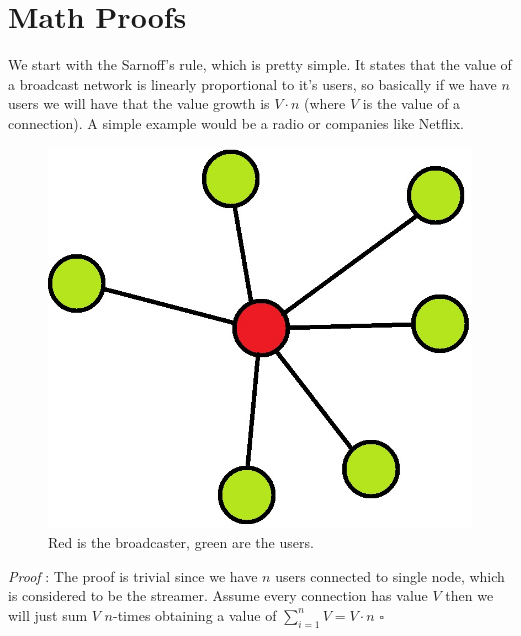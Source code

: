\documentclass[12pt, a4page]{article}
\begin{document}
\part*{Math Proofs}
We start with the Sarnoff's rule, which is pretty simple.
It states that the value of a broadcast network is linearly proportional to it's users, so basically if we have $n$ users we will have that the value growth is $V \cdot n$ (where $V$ is the value of a connection).
A simple example would be a radio or companies like Netflix.
\newline
\begin{figure}[htp]
\centering
\includegraphics[scale=1.00]{IMAGE1.jpg}
\caption{Red is the broadcaster, green are the users.}
\label{IMAGE1}
\end{figure}
\newline
\textit{Proof} : The proof is trivial since we have $n$ users connected to single node, which is considered to be the streamer.
Assume every connection has value $V$ then we will just sum $V$ $n$-times obtaining a value of $\sum_{i=1}^{n} V = V \cdot n$ \hfill $\square$
\newline
\newline
\end{document}
